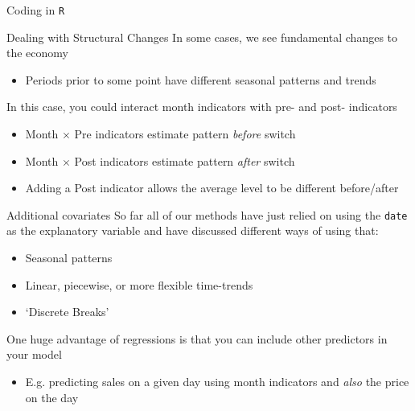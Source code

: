 \documentclass[aspectratio=169,t,11pt,table]{beamer}
\begin{document}

\begin{frame}[fragile]{Coding in \texttt{R}}
\end{frame}

\begin{frame}{Dealing with Structural Changes}
  In some cases, we see fundamental changes to the economy
  \begin{itemize}
    \item Periods prior to some point have different seasonal patterns and trends
  \end{itemize}

  \bigskip
  In this case, you could interact month indicators with pre- and post- indicators 
  \begin{itemize}
    \item Month $\times$ Pre indicators estimate pattern \emph{before} switch
    \item Month $\times$ Post indicators estimate pattern \emph{after} switch
    
    \item Adding a Post indicator allows the average level to be different before/after
  \end{itemize}
\end{frame}



\begin{frame}{Additional covariates}
  So far all of our methods have just relied on using the \texttt{date} as the explanatory variable and have discussed different ways of using that:
  \begin{itemize}
    \item Seasonal patterns
    
    \item Linear, piecewise, or more flexible time-trends
    
    \item `Discrete Breaks'
  \end{itemize}

  \bigskip
  One huge advantage of regressions is that you can include other predictors in your model
  \begin{itemize}
    \item E.g. predicting sales on a given day using month indicators and \emph{also} the price on the day
  \end{itemize}  
\end{frame}
\end{document}

